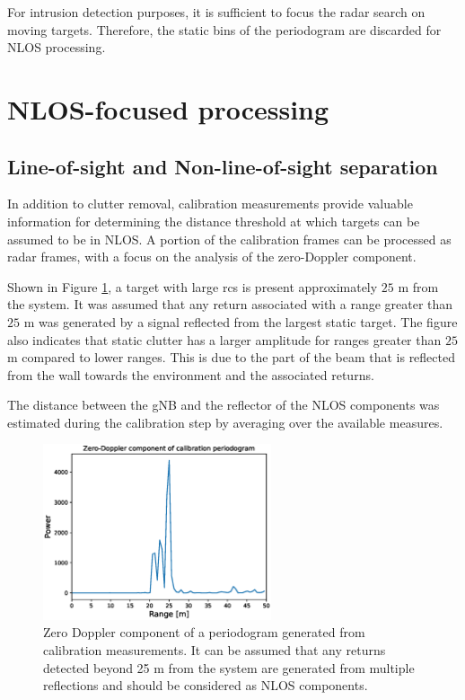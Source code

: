 	For intrusion detection purposes, it is sufficient to focus the radar search on moving targets. 
	Therefore, the static bins of the periodogram are discarded for NLOS processing.
	
	
	\section{NLOS-focused processing}
	\label{sec:nlos_proc_pipeline}
	
		\subsection{Line-of-sight and Non-line-of-sight separation}
		\label{sec:los_nlos_separation}
		
		
		
			In addition to clutter removal, calibration measurements provide valuable information for determining the distance threshold at which targets can be assumed to be in NLOS. 
			A portion of the calibration frames can be processed as radar frames, with a focus on the analysis of the zero-Doppler component.
			
			Shown in Figure \ref{fig:Test1_cali_static_per}, a target with large \gls{rcs} is present approximately $25$ m from the system. It was assumed that any return associated with a range greater than $25$ m was generated by a signal reflected from the largest static target. The figure also indicates that static clutter has a larger amplitude for ranges greater than $25$ m compared to lower ranges. This is due to the part of the beam that is reflected from the wall towards the environment and the associated returns.
			
			The distance between the gNB and the reflector of the NLOS components was estimated during the calibration step by averaging over the available measures.
			
			
			\begin{figure}[H]
				\centering
				\includegraphics[width=0.6\textwidth]{Images/Test1/cali_static_per_t1.eps}
				\caption{\small Zero Doppler component of a periodogram generated from calibration measurements. It can be assumed that any returns detected beyond 25 m from the system are generated from multiple reflections and should be considered as NLOS components. }
				\label{fig:Test1_cali_static_per}
			\end{figure}
		
